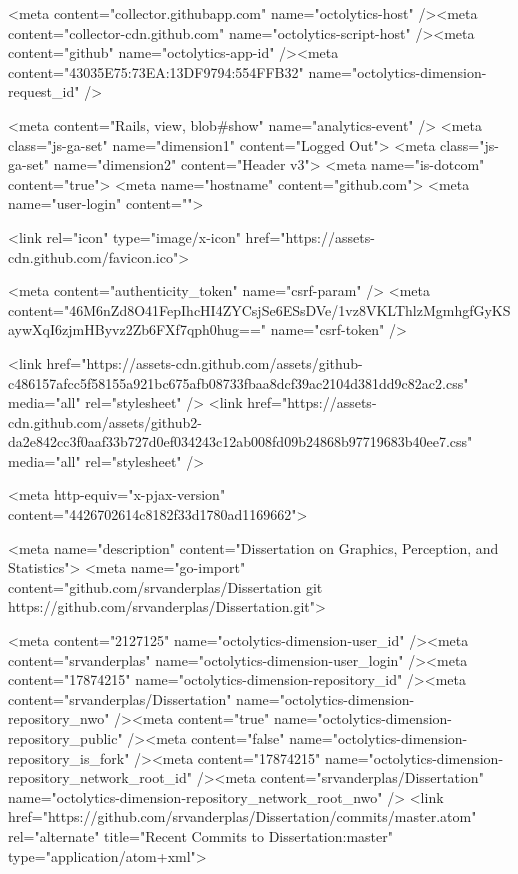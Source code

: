     <meta content="collector.githubapp.com" name="octolytics-host" /><meta content="collector-cdn.github.com" name="octolytics-script-host" /><meta content="github" name="octolytics-app-id" /><meta content="43035E75:73EA:13DF9794:554FFB32" name="octolytics-dimension-request_id" />
    
    <meta content="Rails, view, blob#show" name="analytics-event" />
    <meta class="js-ga-set" name="dimension1" content="Logged Out">
    <meta class="js-ga-set" name="dimension2" content="Header v3">
    <meta name="is-dotcom" content="true">
    <meta name="hostname" content="github.com">
    <meta name="user-login" content="">

    
    <link rel="icon" type="image/x-icon" href="https://assets-cdn.github.com/favicon.ico">


    <meta content="authenticity_token" name="csrf-param" />
<meta content="46M6nZd8O41FepIhcHI4ZYCsjSe6ESsDVe/1vz8VKLThlzMgmhgfGyKSaywXqI6zjmHByvz2Zb6FXf7qph0hug==" name="csrf-token" />

    <link href="https://assets-cdn.github.com/assets/github-c486157afcc5f58155a921bc675afb08733fbaa8dcf39ac2104d381dd9c82ac2.css" media="all" rel="stylesheet" />
    <link href="https://assets-cdn.github.com/assets/github2-da2e842cc3f0aaf33b727d0ef034243c12ab008fd09b24868b97719683b40ee7.css" media="all" rel="stylesheet" />
    
    


    <meta http-equiv="x-pjax-version" content="4426702614c8182f33d1780ad1169662">

      
  <meta name="description" content="Dissertation on Graphics, Perception, and Statistics">
  <meta name="go-import" content="github.com/srvanderplas/Dissertation git https://github.com/srvanderplas/Dissertation.git">

  <meta content="2127125" name="octolytics-dimension-user_id" /><meta content="srvanderplas" name="octolytics-dimension-user_login" /><meta content="17874215" name="octolytics-dimension-repository_id" /><meta content="srvanderplas/Dissertation" name="octolytics-dimension-repository_nwo" /><meta content="true" name="octolytics-dimension-repository_public" /><meta content="false" name="octolytics-dimension-repository_is_fork" /><meta content="17874215" name="octolytics-dimension-repository_network_root_id" /><meta content="srvanderplas/Dissertation" name="octolytics-dimension-repository_network_root_nwo" />
  <link href="https://github.com/srvanderplas/Dissertation/commits/master.atom" rel="alternate" title="Recent Commits to Dissertation:master" type="application/atom+xml">

